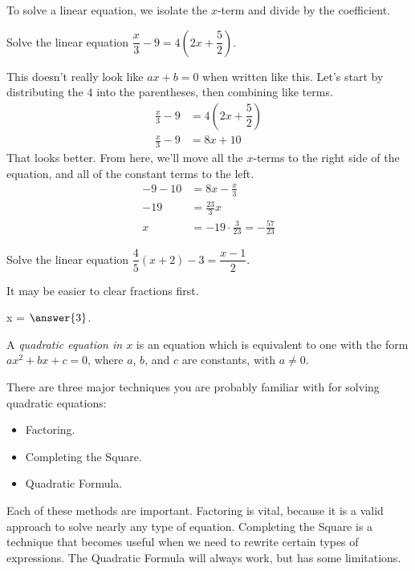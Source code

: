 \documentclass{ximera}
\begin{document}
To solve a linear equation, we isolate the $x$-term and divide by the coefficient.
\begin{example}
	Solve the linear equation $\displaystyle \dfrac{x}{3} - 9 = 4\left( 2x + \dfrac{5}{2} \right)$.

	\begin{explanation}
		This doesn't really look like $ax + b = 0$ when written like this.  Let's start by distributing the $4$ into 
		the parentheses, then combining like terms.
		\begin{align*}
			\frac{x}{3} - 9 &= 4\left( 2x + \dfrac{5}{2} \right) \\
			\frac{x}{3} - 9 &= 8x + 10
		\end{align*}
		That looks better.  From here, we'll move all the $x$-terms to the right side of the equation, and all of
		the constant terms to the left.
		\begin{align*}
			- 9 - 10 &= 8x - \frac{x}{3}\\
			-19 &= \frac{23}{3} x \\
			x &= -19 \cdot \frac{3}{23} = -\frac{57}{23}
		\end{align*}
	\end{explanation}	
\end{example}


\begin{question}
 	Solve the linear equation $\displaystyle \dfrac{4}{5}\left(x+2\right) - 3 = \dfrac{x-1}{2}$. 
 	\begin{hint}
    		It may be easier to clear fractions first.
	\end{hint}
  	\begin{prompt}
    		x = $\answer{3}$.
  	\end{prompt}
\end{question}


A \emph{quadratic equation in $x$} is an equation which is equivalent to one with the form
	$ax^2 + bx + c = 0$, where $a$, $b$, and $c$ are constants, with $a \neq 0$.

There are three major techniques you are probably familiar with for solving quadratic equations:
\begin{itemize}
	\item Factoring.
	\item Completing the Square.
	\item Quadratic Formula.
\end{itemize}

Each of these methods are important.  Factoring is vital, because it is a valid approach to solve nearly any type of equation.  Completing
the Square is a technique that becomes useful when we need to rewrite certain types of expressions.  The Quadratic Formula will always
work, but has some limitations.
\end{document}
